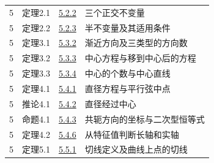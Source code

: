 \documentclass[11pt,a4paper]{article}
\begin{document}
\begin{longtable}{@{}cllp{65mm}@{}}
5&定理2.1&\hyperref[entry:5.2.2]{5.2.2}&三个正交不变量\\

5&定理2.2&\hyperref[entry:5.2.3]{5.2.3}&半不变量及其适用条件\\

5&定理3.1&\hyperref[entry:5.3.2]{5.3.2}&渐近方向及三类型的方向数\\

5&定理3.2&\hyperref[entry:5.3.3]{5.3.3}&中心方程与移到中心后的方程\\

5&定理3.3&\hyperref[entry:5.3.4]{5.3.4}&中心的个数与中心直线\\

5&定理4.1&\hyperref[entry:5.4.1]{5.4.1}&直径方程与平行弦中点\\

5&推论4.1&\hyperref[entry:5.4.2]{5.4.2}&直径经过中心\\

5&命题4.1&\hyperref[entry:5.4.3]{5.4.3}&共轭方向的坐标与二次型恒等式\\

5&定理4.2&\hyperref[entry:5.4.6]{5.4.6}&从特征值判断长轴和实轴\\

5&定理5.1&\hyperref[entry:5.5.1]{5.5.1}&切线定义及曲线上点的切线\\

\bottomrule\end{longtable}
\end{document}
